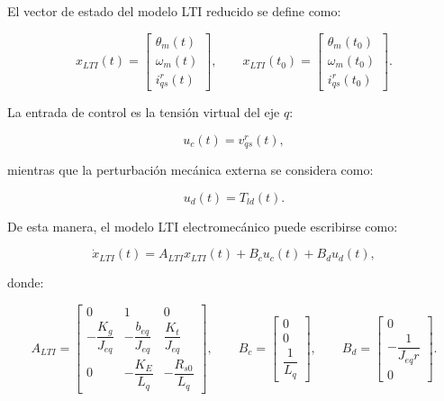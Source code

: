 \documentclass[10pt,a4paper]{article}
\begin{document}
El vector de estado del modelo LTI reducido se define como:

\begin{equation*}
	x_{LTI}(t)
	=
	\begin{bmatrix}
		\theta_m(t)\\
		\omega_m(t)\\
		i_{qs}^r(t)
	\end{bmatrix},
	\qquad
	x_{LTI}(t_0)
	=
	\begin{bmatrix}
		\theta_m(t_0)\\
		\omega_m(t_0)\\
		i_{qs}^r(t_0)
	\end{bmatrix}.
\end{equation*}

La entrada de control es la tensión virtual del eje $q$:

\begin{equation*}
	u_c(t)=v_{qs}^r(t),
\end{equation*}

mientras que la perturbación mecánica externa se considera como:

\begin{equation*}
	u_d(t)=T_{ld}(t).
\end{equation*}

De esta manera, el modelo LTI electromecánico puede escribirse como:

\begin{equation}
	\dot{x}_{LTI}(t)
	=
	A_{LTI}x_{LTI}(t)
	+
	B_cu_c(t)
	+
	B_du_d(t),
	\label{eq:modelo_lti_3x3_general}
\end{equation}

donde:

\begin{equation}
	A_{LTI}
	=
	\begin{bmatrix}
		0 & 1 & 0\\[2mm]
		-\dfrac{K_g}{J_{eq}} & -\dfrac{b_{eq}}{J_{eq}} & \dfrac{K_t}{J_{eq}}\\[3mm]
		0 & -\dfrac{K_E}{L_q} & -\dfrac{R_{s0}}{L_q}
	\end{bmatrix},
	\qquad
	B_c
	=
	\begin{bmatrix}
		0\\[2mm]
		0\\[2mm]
		\dfrac{1}{L_q}
	\end{bmatrix},
	\qquad
	B_d
	=
	\begin{bmatrix}
		0\\[2mm]
		-\dfrac{1}{J_{eq}r}\\[2mm]
		0
	\end{bmatrix}.
	\label{eq:matrices_lti_3x3}
\end{equation}
\end{document}
